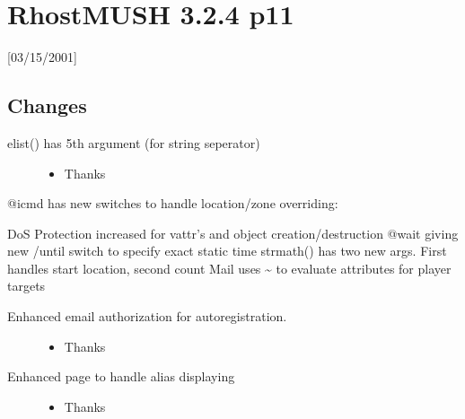 \documentclass[letterpaper,10pt,english]{sphinxmanual}
\begin{document}
\section{RhostMUSH 3.2.4 p11}
\label{\detokenize{changelog:rhostmush-3-2-4-p11}}\label{\detokenize{changelog:changelog-3-2-4p11}}
\sphinxAtStartPar
{[}03/15/2001{]}


\subsection{Changes}
\label{\detokenize{changelog:id40}}\begin{description}
\item[{elist() has 5th argument (for string seperator)}] \leavevmode\begin{itemize}
\item {} 
\sphinxAtStartPar
Thanks 

\end{itemize}

\end{description}

\sphinxAtStartPar
@icmd has new switches to handle location/zone overriding:

\begin{sphinxVerbatim}[commandchars=\\\{\}]
     
     
     
     
       
\end{sphinxVerbatim}

\sphinxAtStartPar
DoS Protection increased for vattr’s and object creation/destruction
@wait giving new /until switch to specify exact static time
strmath() has two new args.  First handles start location, second count
Mail uses \textasciitilde{} to evaluate attributes for player targets
\begin{description}
\item[{Enhanced email authorization for autoregistration.}] \leavevmode\begin{itemize}
\item {} 
\sphinxAtStartPar
Thanks 

\end{itemize}

\item[{Enhanced page to handle alias displaying}] \leavevmode\begin{itemize}
\item {} 
\sphinxAtStartPar
Thanks 

\end{itemize}

\end{description}
\end{document}
